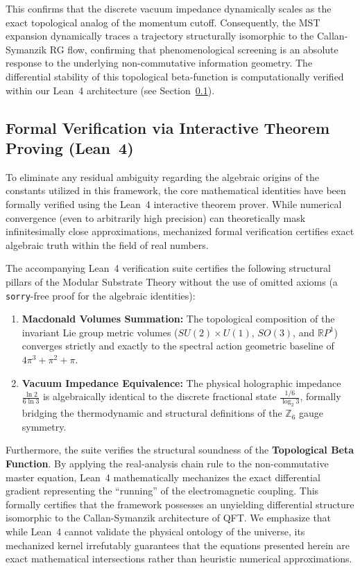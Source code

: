 \documentclass[12pt,a4paper]{article}
\begin{document}
This confirms that the discrete vacuum impedance dynamically scales as the exact topological analog of the momentum cutoff. Consequently, the MST expansion dynamically traces a trajectory structurally isomorphic to the Callan-Symanzik RG flow, confirming that phenomenological screening is an absolute response to the underlying non-commutative information geometry. The differential stability of this topological beta-function is computationally verified within our Lean~4 architecture (see Section~\ref{sec:lean4}).

\subsection{Formal Verification via Interactive Theorem Proving (Lean~4)}
\label{sec:lean4}

To eliminate any residual ambiguity regarding the algebraic origins of the constants utilized in this framework, the core mathematical identities have been formally verified using the Lean~4 interactive theorem prover. While numerical convergence (even to arbitrarily high precision) can theoretically mask infinitesimally close approximations, mechanized formal verification certifies exact algebraic truth within the field of real numbers.

The accompanying Lean~4 verification suite certifies the following structural pillars of the Modular Substrate Theory without the use of omitted axioms (a \texttt{sorry}-free proof for the algebraic identities):
\begin{enumerate}
    \item \textbf{Macdonald Volumes Summation:} The topological composition of the invariant Lie group metric volumes ($SU(2) \times U(1)$, $SO(3)$, and $\mathbb{R}P^1$) converges strictly and exactly to the spectral action geometric baseline of $4\pi^3 + \pi^2 + \pi$.
    \item \textbf{Vacuum Impedance Equivalence:} The physical holographic impedance $\frac{\ln 2}{6 \ln 3}$ is algebraically identical to the discrete fractional state $\frac{1/6}{\log_2 3}$, formally bridging the thermodynamic and structural definitions of the $\mathbb{Z}_6$ gauge symmetry.
\end{enumerate}

Furthermore, the suite verifies the structural soundness of the \textbf{Topological Beta Function}. By applying the real-analysis chain rule to the non-commutative master equation, Lean~4 mathematically mechanizes the exact differential gradient representing the ``running'' of the electromagnetic coupling. This formally certifies that the framework possesses an unyielding differential structure isomorphic to the Callan-Symanzik architecture of QFT. We emphasize that while Lean~4 cannot validate the physical ontology of the universe, its mechanized kernel irrefutably guarantees that the equations presented herein are exact mathematical intersections rather than heuristic numerical approximations.
\end{document}
